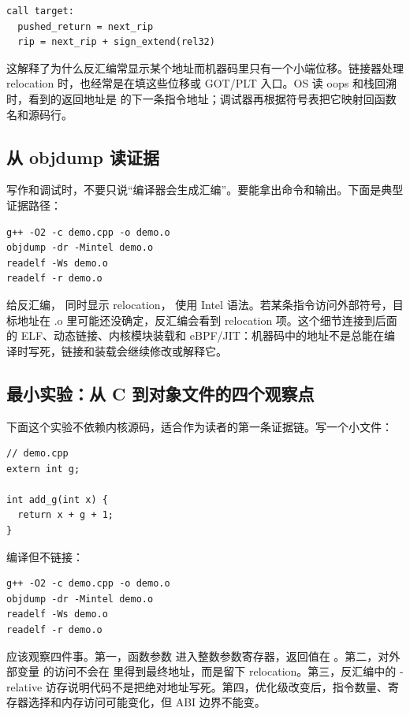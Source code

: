 \begin{lstlisting}
call target:
  pushed_return = next_rip
  rip = next_rip + sign_extend(rel32)
\end{lstlisting}

这解释了为什么反汇编常显示某个地址而机器码里只有一个小端位移。链接器处理 relocation 时，也经常是在填这些位移或 GOT/PLT 入口。OS 读 oops 和栈回溯时，看到的返回地址是  的下一条指令地址；调试器再根据符号表把它映射回函数名和源码行。

\subsection{从 objdump 读证据}

写作和调试时，不要只说“编译器会生成汇编”。要能拿出命令和输出。下面是典型证据路径：

\begin{lstlisting}
g++ -O2 -c demo.cpp -o demo.o
objdump -dr -Mintel demo.o
readelf -Ws demo.o
readelf -r demo.o
\end{lstlisting}

 给反汇编， 同时显示 relocation， 使用 Intel 语法。若某条指令访问外部符号，目标地址在 .o 里可能还没确定，反汇编会看到 relocation 项。这个细节连接到后面的 ELF、动态链接、内核模块装载和 eBPF/JIT：机器码中的地址不是总能在编译时写死，链接和装载会继续修改或解释它。

\subsection{最小实验：从 C 到对象文件的四个观察点}

下面这个实验不依赖内核源码，适合作为读者的第一条证据链。写一个小文件：

\begin{lstlisting}
// demo.cpp
extern int g;

int add_g(int x) {
  return x + g + 1;
}
\end{lstlisting}

编译但不链接：

\begin{lstlisting}
g++ -O2 -c demo.cpp -o demo.o
objdump -dr -Mintel demo.o
readelf -Ws demo.o
readelf -r demo.o
\end{lstlisting}

应该观察四件事。第一，函数参数  进入整数参数寄存器，返回值在 。第二，对外部变量  的访问不会在  里得到最终地址，而是留下 relocation。第三，反汇编中的 -relative 访存说明代码不是把绝对地址写死。第四，优化级改变后，指令数量、寄存器选择和内存访问可能变化，但 ABI 边界不能变。

